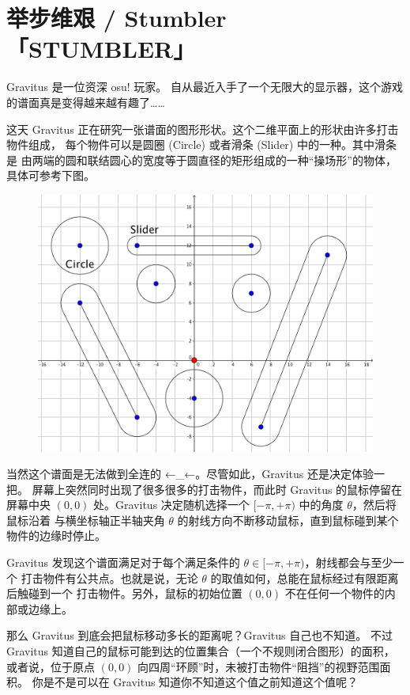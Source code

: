 \documentclass[UTF8, 11pt, a4paper]{article}
\begin{document}
\section*{举步维艰 / Stumbler \makebox[2.5em]{} \small{「STUMBLER」}}
Gravitus 是一位资深 osu! 玩家。%
自从最近入手了一个无限大的显示器，这个游戏的谱面真是变得越来越有趣了……

这天 Gravitus 正在研究一张谱面的图形形状。这个二维平面上的形状由许多打击物件组成，%
每个物件可以是圆圈 (Circle) 或者滑条 (Slider) 中的一种。其中滑条是%
由两端的圆和联结圆心的宽度等于圆直径的矩形组成的一种“操场形”的物体，具体可参考下图。

\begin{figure}[h]\centering
\includegraphics[scale=0.22]{desc.png}
\end{figure}

当然这个谱面是无法做到全连的 ←\_←。尽管如此，Gravitus 还是决定体验一把。%
屏幕上突然同时出现了很多很多的打击物件，而此时 Gravitus 的鼠标停留在屏幕中央 $(0, 0)$ %
处。Gravitus 决定随机选择一个 $[-\pi, +\pi)$ 中的角度 $\theta$，然后将鼠标沿着%
与横坐标轴正半轴夹角 $\theta$ 的射线方向不断移动鼠标，直到鼠标碰到某个物件的边缘时停止。

Gravitus 发现这个谱面满足对于每个满足条件的 $\theta \in [-\pi, +\pi)$，射线都会与至少一个%
打击物件有公共点。也就是说，无论 $\theta$ 的取值如何，总能在鼠标经过有限距离后触碰到一个%
打击物件。另外，鼠标的初始位置 $(0, 0)$ 不在任何一个物件的内部或边缘上。

那么 Gravitus 到底会把鼠标移动多长的距离呢？Gravitus 自己也不知道。%
不过 Gravitus 知道自己的鼠标可能到达的位置集合（一个不规则闭合图形）的面积，%
或者说，位于原点 $(0, 0)$ 向四周“环顾”时，未被打击物件“阻挡”的视野范围面积。%
你是不是可以在 Gravitus 知道你不知道这个值之前知道这个值呢？
\end{document}
